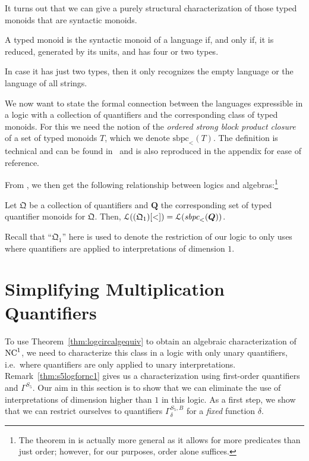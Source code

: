 \documentclass[a4paper,UKenglish,cleveref, autoref, thm-restate, anonymous]{lipics-v2021}
\begin{document}
It turns out that we can give a purely structural characterization of those typed monoids that are syntactic monoids.

\begin{proposition}
    A typed monoid is the syntactic monoid of a language if, and only if, it is reduced, generated by its units, and has four or two types.

In case it has just two types, then it only recognizes the empty language or the language of all strings.
\end{proposition}

We now want to state the formal connection between the languages expressible in a logic with a collection of quantifiers and the corresponding class of typed monoids.  For this we need the notion of the \emph{ordered strong block product closure} of a set of typed monoids $T$, which we denote $\mathrm{sbpc}_<(T)$.  The definition is technical and can be found in~\cite{krebs2008typed} and is also reproduced in the appendix for ease of reference.

From \cite[Theorem 4.14]{krebs2008typed}, we then get the following relationship between logics and algebras:\footnote{The theorem in \cite{krebs2008typed} is actually more general as it allows for more predicates than just order; however, for our purposes, order alone suffices.}
\begin{theorem}\label{thm:logcircalgequiv}
     Let $\mathfrak{Q}$ be a collection of quantifiers and $\bm{Q}$ the corresponding set of typed quantifier monoids for $\mathfrak{Q}$. Then, \(
        \mathcal{L}((\mathfrak{Q}_1)[<]) = \mathcal{L}(\emph{sbpc}_<(\bm{Q}))
    \). 
  \end{theorem}
  Recall that ``$\mathfrak{Q}_1$'' here is used to denote the restriction of our logic to only uses where quantifiers are applied to interpretations of dimension $1$.

\section{Simplifying Multiplication Quantifiers}\label{sec:mult}

To use Theorem~\ref{thm:logcircalgequiv} to obtain an algebraic characterization of $\mathrm{NC}^1$, we need to characterize this class in a logic with only unary quantifiers, i.e.\ where quantifiers are only applied to unary interpretations.  Remark~\ref{thm:s5logfornc1} gives us a characterization using first-order quantifiers and $\Gamma^{S_5}$.  Our aim in this section is to show that we can eliminate the use of interpretations of dimension higher than $1$ in this logic.  As a first step, we show that we can restrict ourselves to quantifiers $\Gamma^{{S_5},B}_{\delta}$ for a \emph{fixed} function $\delta$.
\end{document}

